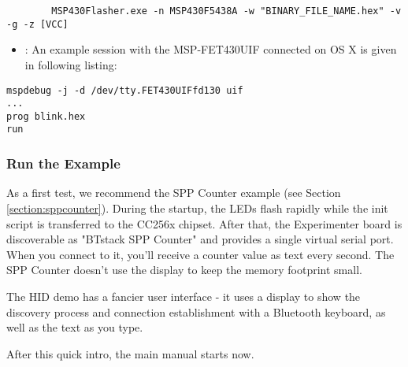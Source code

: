 	   \begin{lstlisting}
 		MSP430Flasher.exe -n MSP430F5438A -w "BINARY_FILE_NAME.hex" -v -g -z [VCC]
	   \end{lstlisting}

 \begin{itemize}
	
	\item \MSPDebug{}: An example session with the MSP-FET430UIF connected on OS X is given in following listing:
\end{itemize}

\begin{lstlisting}
mspdebug -j -d /dev/tty.FET430UIFfd130 uif
... 
prog blink.hex
run
\end{lstlisting}


\subsubsection{Run the Example}

As a first test, we recommend the SPP Counter example (see Section \ref{section:sppcounter}). During the startup, the LEDs flash rapidly while the init script is transferred to the CC256x chipset. After that, the Experimenter board is discoverable as "BTstack SPP Counter" and provides a single virtual serial port. When you connect to it, you'll receive a counter value as text every second. The SPP Counter doesn't use the display to keep the memory footprint small.

The HID demo has a fancier user interface - it uses a display to show the discovery process and connection establishment with a Bluetooth keyboard, as well as the text as you type.

After this quick intro, the main manual starts now.

 

